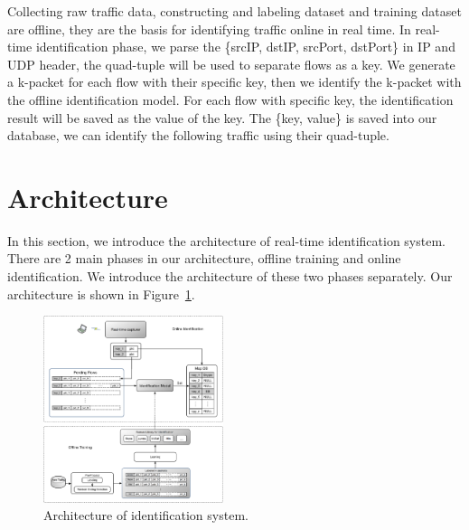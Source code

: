 \documentclass[conference]{IEEEtran}
\begin{document}
Collecting raw traffic data, constructing and labeling dataset and training dataset are offline, they are the basis for identifying traffic online in real time. In real-time identification phase, we parse the \{srcIP, dstIP, srcPort, dstPort\} in IP and UDP header, the quad-tuple will be used to separate flows as a key. We generate a k-packet for each flow with their specific key, then we identify the k-packet with the offline identification model. For each flow with specific key, the identification result will be saved as the value of the key. The \{key, value\} is saved into our database, we can identify the following traffic using their quad-tuple.

\section{Architecture}
\label{sec:architecture}
In this section, we introduce the architecture of real-time identification system. There are 2 main phases in our architecture, offline training and online identification. We introduce the architecture of these two phases separately.
Our architecture is shown in Figure~\ref{fig:architecture}.

\begin{figure}[htp]
\begin{center}
\includegraphics[width=0.47\textwidth]{architecture.eps}
\caption{Architecture of identification system.}\label{fig:architecture}
\end{center}
\end{figure}
\end{document}

